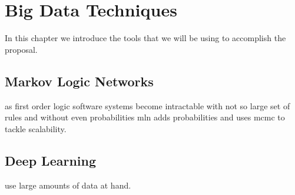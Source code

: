 \chapter{Big Data Techniques}

In this chapter we introduce the tools that we will be using to accomplish the proposal.

\section{Markov Logic Networks}
as first order logic software systems become intractable with not so large set of rules and without even probabilities mln adds probabilities and uses mcmc to tackle scalability.
\section{Deep Learning}
use large amounts of data at hand.